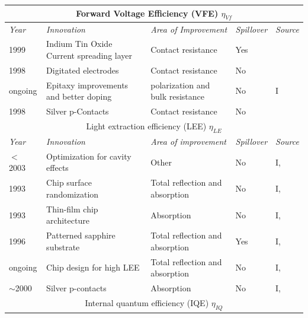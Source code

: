 \documentclass[10pt]{article}
\begin{document}
\begin{table}[H]
    \begin{tabularx}{\textwidth}{ |l|X|X|l|l| }
        \multicolumn{5}{c}{Forward Voltage Efficiency (VFE) $\eta_{Vf}$} \\
        \hline
            \textit{Year} & \textit{Innovation} & \textit{Area of Improvement} & \textit{Spillover} & \textit{Source} \\
        \hline
            1999 & Indium Tin Oxide \newline Current spreading layer & Contact resistance & Yes & \cite{margalith1999indium}\\
        \hline
            1998 & Digitated electrodes & Contact resistance & No & \cite{steigerwald2001electrode} \\
        \hline
            ongoing & Epitaxy improvements \newline and better doping & polarization and \newline bulk resistance & No & I \\
        \hline
            1998 & Silver p-Contacts & Contact resistance & No & \cite{kondoh2001nitride} \\
        \hline
        \multicolumn{5}{c}{Light extraction efficiency (LEE) $\eta_{LE}$} \\
        \hline
            \textit{Year} & \textit{Innovation} & \textit{Area of improvement} & \textit{Spillover} & \textit{Source} \\
        \hline
            $<$ 2003 & Optimization for \newline cavity effects & Other & No & I, \cite{Shen2003} \\
        \hline
            1993 & Chip surface randomization & Total reflection and absorption & No & I, \cite{bergh1973surface}\cite{Schnitzer1993} \\
        \hline
            1993 & Thin-film chip architecture & Absorption & No & I, \cite{Schnitzer1993} \\
        \hline
            1996 & Patterned sapphire substrate  & Total reflection and absorption & Yes & I, \cite{Tadatomo2001} \\
        \hline
            ongoing & Chip design for high LEE & Total reflection and absorption & No & I, \cite{Haerle2004} \\
        \hline
            $\sim$2000 & Silver p-contacts & Absorption & No & I, \cite{kondoh2001nitride} \\
        \hline
        \multicolumn{5}{c}{Internal quantum efficiency (IQE) $\eta_{IQ}$} \\

\end{tabularx}
\end{table}
\end{document}

